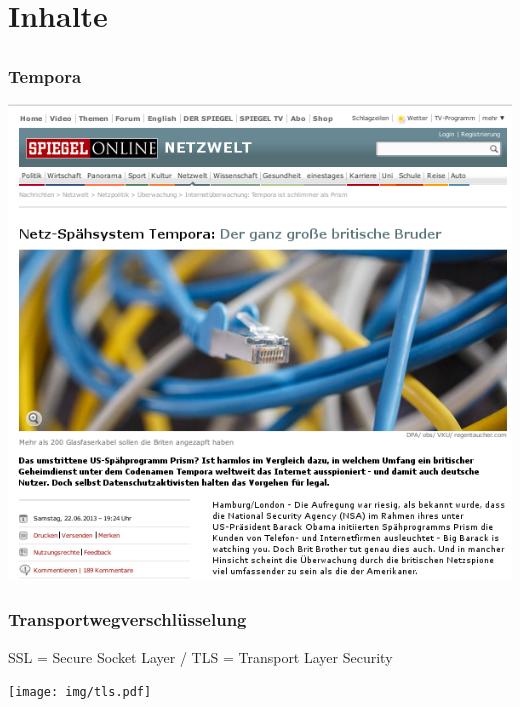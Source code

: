 \documentclass[12pt, xcolor={svgnames,table}]{beamer}
\begin{document}
\section{Inhalte}
\subsection{}

\begin{frame}
    \frametitle{Tempora}
    \includegraphics[height=0.7\textheight]{img/spiegel-tempora.png}
\end{frame}

\begin{frame}
    \frametitle{Transportwegverschlüsselung}
      SSL = Secure Socket Layer / TLS = Transport Layer Security
    \vfill
    \begin{center}
      \texttt{[image: img/tls.pdf]}
    \end{center}
\end{frame}
\end{document}
